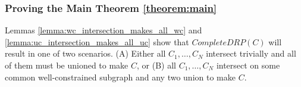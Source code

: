 \subsubsection{Proving the Main Theorem \ref{theorem:main}}
\label{sec:maintheorem}
Lemmas \ref{lemma:wc_intersection_makes_all_wc} and \ref{lemma:uc_intersection_makes_all_uc} show that $CompleteDRP(C)$ will result in one of two scenarios. (A) Either all $C_1,\ldots,C_N$ intersect trivially and all of them must be unioned to make $C$, or (B) all $C_1,\ldots,C_N$ intersect on some common well-constrained subgraph and any two union to make $C$.














